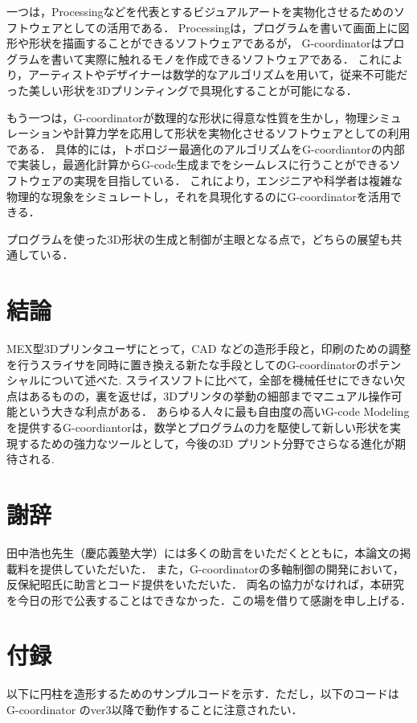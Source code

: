 \documentclass{article}
\begin{document}
\begin{twocolumn}
\begin{itemize}
一つは，Processingなどを代表とするビジュアルアートを実物化させるためのソフトウェアとしての活用である．
Processingは，プログラムを書いて画面上に図形や形状を描画することができるソフトウェアであるが，
G-coordinatorはプログラムを書いて実際に触れるモノを作成できるソフトウェアである．
これにより，アーティストやデザイナーは数学的なアルゴリズムを用いて，従来不可能だった美しい形状を3Dプリンティングで具現化することが可能になる．

もう一つは，G-coordinatorが数理的な形状に得意な性質を生かし，物理シミュレーションや計算力学を応用して形状を実物化させるソフトウェアとしての利用である．
具体的には，トポロジー最適化のアルゴリズムをG-coordiantorの内部で実装し，最適化計算からG-code生成までをシームレスに行うことができるソフトウェアの実現を目指している．
これにより，エンジニアや科学者は複雑な物理的な現象をシミュレートし，それを具現化するのにG-coordinatorを活用できる．

プログラムを使った3D形状の生成と制御が主眼となる点で，どちらの展望も共通している．

\section{結論}

MEX型3Dプリンタユーザにとって，CAD などの造形手段と，印刷のための調整を行うスライサを同時に置き換える新たな手段としてのG-coordinatorのポテンシャルについて述べた.
スライスソフトに比べて，全部を機械任せにできない欠点はあるものの，裏を返せば，3Dプリンタの挙動の細部までマニュアル操作可能という大きな利点がある．
あらゆる人々に最も自由度の高いG-code Modelingを提供するG-coordiantorは，数学とプログラムの力を駆使して新しい形状を実現するための強力なツールとして，今後の3D プリント分野でさらなる進化が期待される.


\section{謝辞}
田中浩也先生（慶応義塾大学）には多くの助言をいただくとともに，本論文の掲載料を提供していただいた．
また，G-coordinatorの多軸制御の開発において，反保紀昭氏に助言とコード提供をいただいた．
両名の協力がなければ，本研究を今日の形で公表することはできなかった．この場を借りて感謝を申し上げる．


\section{付録}
以下に円柱を造形するためのサンプルコードを示す．ただし，以下のコードはG-coordinator  のver3以降で動作することに注意されたい．


\end{itemize}
\end{twocolumn}
\end{document}
